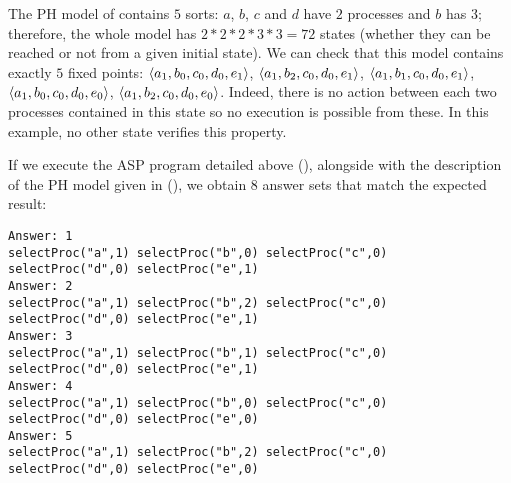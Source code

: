 \begin{example}
The PH model of  contains $5$ sorts:
$a$, $b$, $c$ and $d$ have $2$ processes and $b$ has 3; therefore, the whole model has $2*2*2*3*3 = 72$ states (whether they can be reached or not from a given initial state).
We can check that this model contains exactly $5$ fixed points: $\mbox{$\langle a_1, b_0, c_0, d_0, e_1 \rangle$}$, $\mbox{$\langle a_1, b_2, c_0, d_0, e_1 \rangle$}$, $\mbox{$\langle a_1, b_1, c_0, d_0, e_1 \rangle$}$, $\mbox{$\langle a_1, b_0, c_0, d_0, e_0 \rangle$}$, $\mbox{$\langle a_1, b_2, c_0, d_0, e_0 \rangle$}$.
Indeed, there is no action between each two processes contained in this state so no execution is possible from these. In this example, no other state verifies this property.

If we execute the ASP program detailed above (),
alongside with the description of the PH model given in  (),
we obtain $8$ answer sets that match the expected result:
\begin{changemargin}{-2cm}{-1cm}
\begin{lstlisting}[numbers=none]
Answer: 1
selectProc("a",1) selectProc("b",0) selectProc("c",0) selectProc("d",0) selectProc("e",1)
Answer: 2
selectProc("a",1) selectProc("b",2) selectProc("c",0) selectProc("d",0) selectProc("e",1)
Answer: 3
selectProc("a",1) selectProc("b",1) selectProc("c",0) selectProc("d",0) selectProc("e",1)
Answer: 4
selectProc("a",1) selectProc("b",0) selectProc("c",0) selectProc("d",0) selectProc("e",0)
Answer: 5
selectProc("a",1) selectProc("b",2) selectProc("c",0) selectProc("d",0) selectProc("e",0)
\end{lstlisting}
\end{changemargin}
\end{example}